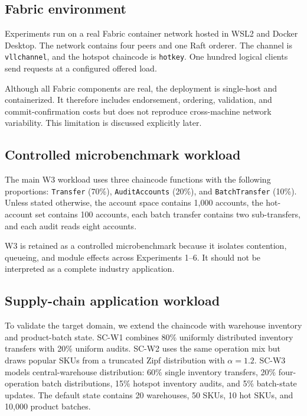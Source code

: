 \documentclass[fleqn,10pt,lineno]{wlpeerj}
\begin{document}
\subsection*{Fabric environment}

Experiments run on a real Fabric container network hosted in WSL2 and Docker Desktop. The network contains four peers and one Raft orderer. The channel is \texttt{vllchannel}, and the hotspot chaincode is \texttt{hotkey}. One hundred logical clients send requests at a configured offered load.

Although all Fabric components are real, the deployment is single-host and containerized. It therefore includes endorsement, ordering, validation, and commit-confirmation costs but does not reproduce cross-machine network variability. This limitation is discussed explicitly later.

\subsection*{Controlled microbenchmark workload}

The main W3 workload uses three chaincode functions with the following proportions: \texttt{Transfer} (70\%), \texttt{AuditAccounts} (20\%), and \texttt{BatchTransfer} (10\%). Unless stated otherwise, the account space contains 1,000 accounts, the hot-account set contains 100 accounts, each batch transfer contains two sub-transfers, and each audit reads eight accounts.

W3 is retained as a controlled microbenchmark because it isolates contention, queueing, and module effects across Experiments 1--6. It should not be interpreted as a complete industry application.

\subsection*{Supply-chain application workload}

To validate the target domain, we extend the chaincode with warehouse inventory and product-batch state. SC-W1 combines 80\% uniformly distributed inventory transfers with 20\% uniform audits. SC-W2 uses the same operation mix but draws popular SKUs from a truncated Zipf distribution with $\alpha=1.2$. SC-W3 models central-warehouse distribution: 60\% single inventory transfers, 20\% four-operation batch distributions, 15\% hotspot inventory audits, and 5\% batch-state updates. The default state contains 20 warehouses, 50 SKUs, 10 hot SKUs, and 10,000 product batches.
\end{document}
